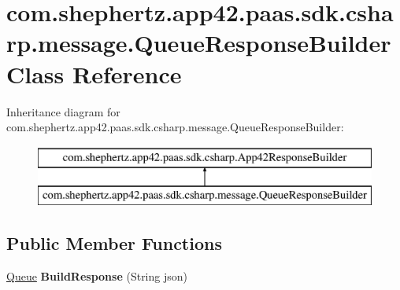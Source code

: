 \hypertarget{classcom_1_1shephertz_1_1app42_1_1paas_1_1sdk_1_1csharp_1_1message_1_1_queue_response_builder}{\section{com.\+shephertz.\+app42.\+paas.\+sdk.\+csharp.\+message.\+Queue\+Response\+Builder Class Reference}
\label{classcom_1_1shephertz_1_1app42_1_1paas_1_1sdk_1_1csharp_1_1message_1_1_queue_response_builder}
}
Inheritance diagram for com.\+shephertz.\+app42.\+paas.\+sdk.\+csharp.\+message.\+Queue\+Response\+Builder\+:\begin{figure}[H]
\begin{center}
\leavevmode
\includegraphics[height=2.000000cm]{classcom_1_1shephertz_1_1app42_1_1paas_1_1sdk_1_1csharp_1_1message_1_1_queue_response_builder}
\end{center}
\end{figure}
\subsection*{Public Member Functions}
\begin{DoxyCompactItemize}
\item 
\hypertarget{classcom_1_1shephertz_1_1app42_1_1paas_1_1sdk_1_1csharp_1_1message_1_1_queue_response_builder_a5571f3f8a435a27ed15b4fa7d2ea4a56}{\hyperlink{classcom_1_1shephertz_1_1app42_1_1paas_1_1sdk_1_1csharp_1_1message_1_1_queue}{Queue} {\bfseries Build\+Response} (String json)}\label{classcom_1_1shephertz_1_1app42_1_1paas_1_1sdk_1_1csharp_1_1message_1_1_queue_response_builder_a5571f3f8a435a27ed15b4fa7d2ea4a56}

\end{DoxyCompactItemize}
